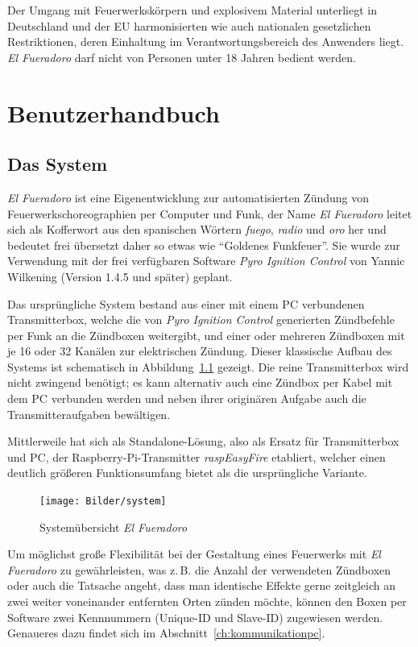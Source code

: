 \documentclass[paper=a4, parskip, numbers=noenddot, toc=listof, headsepline]{scrbook}
\newcommand{\pic}{\emph{Pyro Ignition Control}}
\newcommand{\anlage}{\emph{El Fueradoro}}
\begin{document}
	Der Umgang mit Feuerwerkskörpern und explosivem Material unterliegt in Deutschland und der EU harmonisierten wie auch nationalen gesetzlichen Restriktionen, deren Einhaltung im Verantwortungsbereich des Anwenders liegt. {\anlage} darf nicht von Personen unter 18 Jahren bedient werden.

	\tableofcontents
\part{Benutzerhandbuch}

	\chapter{Das System}

		\anlage{} ist eine Eigenentwicklung zur automatisierten Zündung von Feuer\-werks\-choreo\-gra\-phien per Computer und Funk, der Name {\anlage} leitet sich als Kofferwort aus den spanischen Wörtern \emph{fuego}, \emph{radio} und \emph{oro} her und bedeutet frei übersetzt daher so etwas wie \enquote{Goldenes Funkfeuer}. Sie wurde zur Verwendung mit der frei verfügbaren Software {\pic} von Yannic Wilkening (Version 1.4.5 und später) geplant.

		Das ursprüngliche System bestand aus einer mit einem PC verbundenen Transmitterbox, welche die von {\pic} generierten Zündbefehle per Funk an die Zündboxen weitergibt, und einer oder mehreren Zündboxen mit je 16 oder 32 Kanälen zur elektrischen Zündung. Dieser klassische Aufbau des Systems ist schematisch in Abbildung~\ref{fig:system} gezeigt. Die reine Transmitterbox wird nicht zwingend benötigt; es kann alternativ auch eine Zündbox per Kabel mit dem PC verbunden werden und neben ihrer originären Aufgabe auch die Transmitteraufgaben bewältigen.
		
		Mittlerweile hat sich als Standalone-Lösung, also als Ersatz für Transmitterbox und PC, der Raspberry-Pi-Transmitter \emph{raspEasyFire} etabliert, welcher einen deutlich größeren Funktionsumfang bietet als die ursprüngliche Variante.

		\begin{figure}
			\centering
			\texttt{[image: Bilder/system]}
			\caption{Systemübersicht \anlage}
			\label{fig:system}
		\end{figure}

		Um möglichst große Flexibilität bei der Gestaltung eines Feuerwerks mit {\anlage} zu gewährleisten, was z.\,B. die Anzahl der verwendeten Zündboxen oder auch die Tatsache angeht, dass man identische Effekte gerne zeitgleich an zwei weiter voneinander entfernten Orten zünden möchte, können den Boxen per Software zwei Kennnummern (Unique-ID und Slave-ID) zugewiesen werden. Genaueres dazu findet sich im Abschnitt~\ref{ch:kommunikationpc}.
\end{document}
